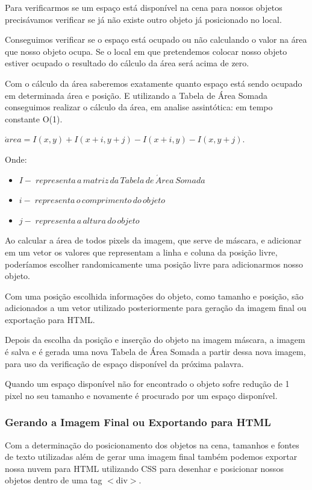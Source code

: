 \documentclass[12pt]{article}
\begin{document}
Para verificarmos se um espaço está disponível na cena para nossos objetos precisávamos verificar se já não existe outro objeto já posicionado no local. 

Conseguimos verificar se o espaço está ocupado ou não calculando o valor na área que nosso objeto ocupa. Se o local em que pretendemos colocar nosso objeto estiver ocupado o resultado do cálculo da área será acima de zero.

Com o cálculo da área saberemos exatamente quanto espaço está sendo ocupado em determinada área e posição. E utilizando a Tabela de Área Somada conseguimos realizar o cálculo da área, em analise assintótica: em tempo constante O(1).

$\acute{a}rea = I(x,y) + I(x + i,y + j) - I(x + i,y) - I(x,y + j).$

Onde:

\begin{itemize}  
  \item $I -\; representa\,a\,matriz\,da\,Tabela\,de\,\acute{A}rea\,Somada$
  \item $i -\; representa\,o\,comprimento\,do\,objeto$
  \item $j -\; representa\,a\,altura\,do\,objeto$
\end{itemize}
 

Ao calcular a área de todos pixels da imagem, que serve de máscara, e adicionar em um vetor os valores que representam a linha e coluna da posição livre, poderíamos escolher randomicamente uma posição livre para adicionarmos nosso objeto.

Com uma posição escolhida informações do objeto, como tamanho e posição, são adicionados a um vetor utilizado posteriormente para geração da imagem final ou exportação para HTML. 

Depois da escolha da posição e inserção do objeto na imagem máscara, a imagem é salva e é gerada uma nova Tabela de Área Somada a partir dessa nova imagem, para uso da verificação de espaço disponível da próxima palavra. 

Quando um espaço disponível não for encontrado o objeto sofre redução de 1 pixel no seu tamanho e novamente é procurado por um espaço disponível.

\subsubsection{Gerando a Imagem Final ou Exportando para HTML}

Com a determinação do posicionamento dos objetos na cena, tamanhos e fontes de texto utilizadas além de gerar uma imagem final também podemos exportar nossa nuvem para HTML utilizando CSS para desenhar e posicionar nossos objetos dentro de uma tag $<$div$>$.
\end{document}
